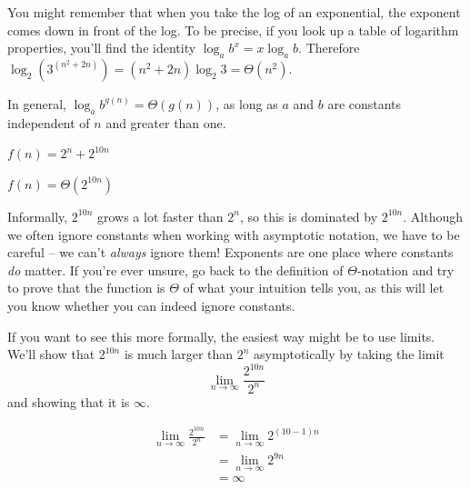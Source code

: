 \begin{prob}
\begin{subprobset}
\begin{subprob}
\begin{soln}
                You might remember that when you take the log of an exponential, the exponent
                comes down in front of the log. To be precise,
                if you look up a table of logarithm properties, you'll find
                the identity $\log_a b^x = x \log_a b$.  Therefore $\log_2(3^{(n^2 + 2n)}) = (n^2 + 2n) \log_2 3 = \Theta(n^2)$.

                In general, $\log_a b^{g(n)} = \Theta(g(n))$, as long as $a$ and $b$ are constants independent of $n$
                and greater than one.
            \end{soln}
        \end{subprob}

        \begin{subprob}
            $f(n) = 2^n + 2^{10n} $

            \begin{soln}
                $f(n) = \Theta(2^{10n})$

                Informally,
                $2^{10n}$ grows a lot faster than $2^{n}$, so this is dominated by $2^{10n}$.
                Although we often ignore constants when working with asymptotic notation,
                we have to be careful -- we can't \emph{always} ignore them!
                Exponents are one place where constants \emph{do} matter. If you're ever
                unsure, go back to the definition of $\Theta$-notation and try to prove
                that the function is $\Theta$ of what your intuition tells you, as this
                will let you know whether you can indeed ignore constants.

                If you want to see this more formally, the easiest way might be to use
                limits. We'll show that $2^{10n}$ is much larger than $2^n$ asymptotically
                by taking the limit
                \[
                    \lim_{n \to \infty} \frac{2^{10n}}{2^n}
                \]
                and showing that it is $\infty$.

                \begin{align*}
                    \lim_{n \to \infty}
                        \frac{2^{10n}}{2^n}
                    &=
                    \lim_{n \to \infty}
                        2^{(10 - 1)n}
                        \\
                    &=
                    \lim_{n \to \infty}
                        2^{9n}
                        \\
                    &= \infty
                \end{align*}


\end{soln}
\end{subprob}
\end{subprobset}
\end{prob}
